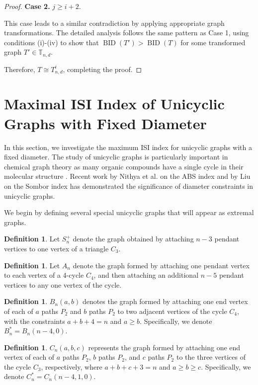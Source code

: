 \documentclass[12pt]{article}
\theoremstyle{definition}
\newtheorem{definition}[theorem]{Definition}
\newcommand{\BID}{\operatorname{BID}}
\newcommand{\TT}{\mathbb{T}}
\begin{document}
\begin{proof}
\textbf{Case 2.} \(j \geq i+2\).

This case leads to a similar contradiction by applying appropriate graph transformations. The detailed analysis follows the same pattern as Case 1, using conditions (i)-(iv) to show that \(\BID(T') > \BID(T)\) for some transformed graph \(T' \in \TT_{n,d}\).

Therefore, \(T \cong T_{n,d}^i\), completing the proof.
\end{proof}

\section{Maximal ISI Index of Unicyclic Graphs with Fixed Diameter}

In this section, we investigate the maximum ISI index for unicyclic graphs with a fixed diameter. The study of unicyclic graphs is particularly important in chemical graph theory as many organic compounds have a single cycle in their molecular structure \cite{trinajstic1992chemical}. Recent work by Nithya et al. \cite{nithya2023smallest} on the ABS index and by Liu \cite{liu2022sombor} on the Sombor index has demonstrated the significance of diameter constraints in unicyclic graphs.

We begin by defining several special unicyclic graphs that will appear as extremal graphs.

\begin{definition}
Let \(S_n^+\) denote the graph obtained by attaching \(n-3\) pendant vertices to one vertex of a triangle \(C_3\).
\end{definition}

\begin{definition}
Let \(A_n\) denote the graph formed by attaching one pendant vertex to each vertex of a 4-cycle \(C_4\), and then attaching an additional \(n-5\) pendant vertices to any one vertex of the cycle.
\end{definition}

\begin{definition}
\(B_n(a,b)\) denotes the graph formed by attaching one end vertex of each of \(a\) paths \(P_2\) and \(b\) paths \(P_2\) to two adjacent vertices of the cycle \(C_4\), with the constraints \(a + b + 4 = n\) and \(a \geq b\). Specifically, we denote \(B_n^* = B_n(n-4,0)\).
\end{definition}

\begin{definition}
\(C_n(a,b,c)\) represents the graph formed by attaching one end vertex of each of \(a\) paths \(P_2\), \(b\) paths \(P_2\), and \(c\) paths \(P_2\) to the three vertices of the cycle \(C_3\), respectively, where \(a + b + c + 3 = n\) and \(a \geq b \geq c\). Specifically, we denote \(C_n^* = C_n(n-4,1,0)\).
\end{definition}
\end{document}
